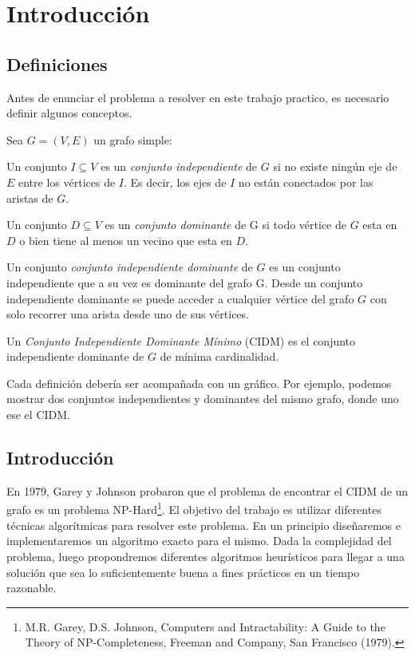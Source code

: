 \section{Introducción}

\subsection{Definiciones}

Antes de enunciar el problema a resolver en este trabajo practico, es necesario definir algunos conceptos.

Sea $G = (V,E)$ un grafo simple:
\begin{definition}
Un conjunto $I \subseteq V$ es un \textit{conjunto independiente} de $G$ si no existe ningún eje de $E$ entre los vértices de $I$. Es decir, los ejes de $I$ no están conectados por las aristas de $G$.
\end{definition}

\begin{definition}
Un conjunto $D \subseteq V$ es un \textit{conjunto dominante} de G si todo vértice de $G$ esta en $D$ o bien tiene al menos un vecino que esta en $D$.
\end{definition}

\begin{definition}
Un conjunto \textit{conjunto independiente dominante} de $G$ es un conjunto independiente que a su vez es dominante del grafo G. Desde un conjunto independiente dominante se puede acceder a cualquier vértice del grafo $G$ con solo recorrer una arista desde uno de sus vértices.
\end{definition}

\begin{definition}
Un \textit{Conjunto Independiente Dominante Mínimo} (CIDM) es el conjunto independiente dominante de $G$ de mínima cardinalidad.
\end{definition}

Cada definición debería ser acompañada con un gráfico. Por ejemplo, podemos mostrar dos conjuntos independientes y dominantes del mismo grafo, donde uno ese el CIDM.

\subsection{Introducción}
En 1979, Garey y Johnson probaron que el problema de encontrar el CIDM de un grafo es un problema NP-Hard\footnote{M.R. Garey, D.S. Johnson, Computers and Intractability: A Guide to the Theory of NP-Completeness, Freeman and Company, San Francisco (1979).}.
El objetivo del trabajo es utilizar diferentes técnicas algorítmicas para resolver este problema. En un principio diseñaremos e implementaremos un algoritmo exacto para el mismo. Dada la complejidad del problema, luego propondremos diferentes algoritmos heurísticos para llegar a una solución que sea lo suficientemente buena a fines prácticos en un tiempo razonable.


